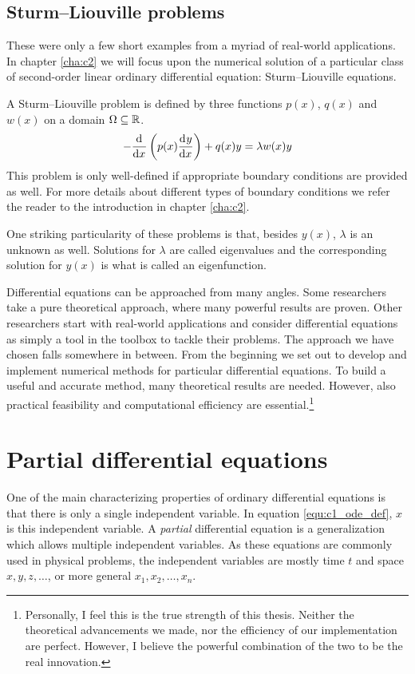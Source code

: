 \subsection{Sturm--Liouville problems}

These were only a few short examples from a myriad of real-world applications. In chapter \ref{cha:c2} we will focus upon the numerical solution of a particular class of second-order linear ordinary differential equation: Sturm--Liouville equations.

A Sturm--Liouville problem is defined by three functions $p(x)$, $q(x)$ and $w(x)$ on a domain $\Omega \subseteq \mathbb{R}$.
$$
    -{\dv[]{}{x}}\left(p(x) \dv[]{y}{x}\right) + q(x) y = \lambda w(x) y
$$
This problem is only well-defined if appropriate boundary conditions are provided as well. For more details about different types of boundary conditions we refer the reader to the introduction in chapter \ref{cha:c2}.

One striking particularity of these problems is that, besides $y(x)$, $\lambda$ is an unknown as well. Solutions for $\lambda$ are called eigenvalues and the corresponding solution for $y(x)$ is what is called an eigenfunction.

Differential equations can be approached from many angles. Some researchers take a pure theoretical approach, where many powerful results are proven. Other researchers start with real-world applications and consider differential equations as simply a tool in the toolbox to tackle their problems. The approach we have chosen falls somewhere in between. From the beginning we set out to develop and implement numerical methods for particular differential equations. To build a useful and accurate method, many theoretical results are needed. However, also practical feasibility and computational efficiency are essential.\footnote{Personally, I feel this is the true strength of this thesis. Neither the theoretical advancements we made, nor the efficiency of our implementation are perfect. However, I believe the powerful combination of the two to be the real innovation.}


\section{Partial differential equations}

One of the main characterizing properties of ordinary differential equations is that there is only a single independent variable. In equation \eqref{equ:c1_ode_def}, $x$ is this independent variable. A \emph{partial} differential equation is a generalization which allows multiple independent variables. As these equations are commonly used in physical problems, the independent variables are mostly time $t$ and space $x, y, z, \dots$, or more general $x_1, x_2, \dots, x_n$.

